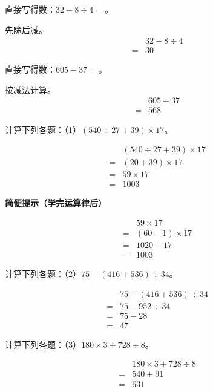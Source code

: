 直接写得数：\(32-8\div4=\)。\par
\begin{BookAnswer}
先除后减。\[\begin{aligned} &32-8\div4\\={}&30\end{aligned}\]
\end{BookAnswer}

直接写得数：\(605-37=\)。\par
\begin{BookAnswer}
按减法计算。\[\begin{aligned} &605-37\\={}&568\end{aligned}\]
\end{BookAnswer}

计算下列各题：（1）\((540\div27+39)\times17\)。\par
\begin{BookAnswer}
\[\begin{aligned} &(540\div27+39)\times17\\={}&(20+39)\times17\\={}&59\times17\\={}&1003\end{aligned}\]\par\textbf{简便提示（学完运算律后）}\par \[\begin{aligned}&59\times17\\={}&(60-1)\times17\\={}&1020-17\\={}&1003\end{aligned}\]
\end{BookAnswer}

计算下列各题：（2）\(75-(416+536)\div34\)。\par
\begin{BookAnswer}
\[\begin{aligned} &75-(416+536)\div34\\={}&75-952\div34\\={}&75-28\\={}&47\end{aligned}\]
\end{BookAnswer}

计算下列各题：（3）\(180\times3+728\div8\)。\par
\begin{BookAnswer}
\[\begin{aligned} &180\times3+728\div8\\={}&540+91\\={}&631\end{aligned}\]
\end{BookAnswer}

